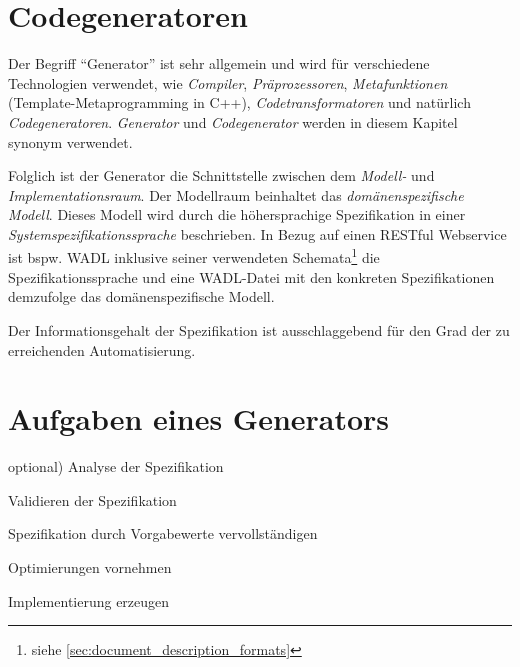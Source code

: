 \section{Codegeneratoren}


Der Begriff \enquote{Generator} ist sehr allgemein und wird für verschiedene Technologien verwendet, wie \emph{Compiler}, \emph{Präprozessoren}, \emph{Metafunktionen} (Template-Metaprogramming in C++), \emph{Codetransformatoren} und natürlich \emph{Codegeneratoren}. 
\emph{Generator} und \emph{Codegenerator} werden in diesem Kapitel synonym verwendet.


Folglich ist der Generator die Schnittstelle zwischen dem \emph{Modell-} und \emph{Implementationsraum}. Der Modellraum beinhaltet das \emph{domänenspezifische Modell}. Dieses Modell wird durch die höhersprachige Spezifikation in einer \emph{Systemspezifikationssprache} beschrieben. In Bezug auf einen RESTful Webservice ist bspw. \gls{WADL} inklusive seiner verwendeten Schemata\footnote{siehe \cref{sec:document_description_formats}} die Spezifikationssprache und eine WADL-Datei mit den konkreten Spezifikationen demzufolge das domänenspezifische Modell.

Der Informationsgehalt der Spezifikation ist ausschlaggebend für den Grad der zu erreichenden Automatisierung.

\section{Aufgaben eines Generators}
\label{sec:generator_tasks}

\begin{compactenum}
    \item[optional)] Analyse der Spezifikation
    \item Validieren der Spezifikation
    \item Spezifikation durch Vorgabewerte vervollständigen
    \item Optimierungen vornehmen
    \item Implementierung erzeugen
\end{compactenum}

